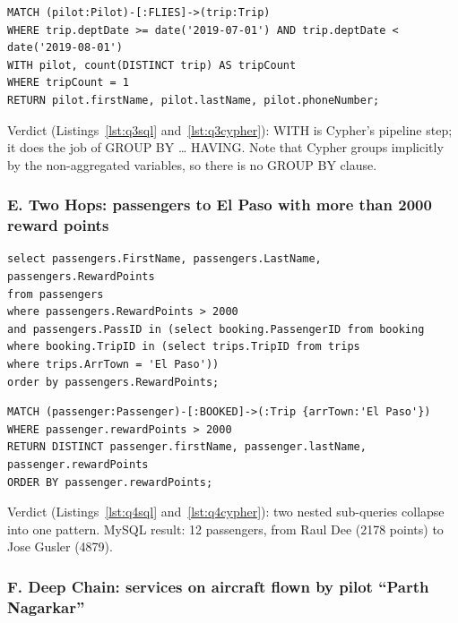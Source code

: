 \documentclass[10pt,a4paper,twocolumn]{article}
\begin{document}
\begin{lstlisting}[style=cyphercode,caption={The same query in Cypher, using WITH in place of GROUP BY and HAVING},label={lst:q3cypher}]
MATCH (pilot:Pilot)-[:FLIES]->(trip:Trip)
WHERE trip.deptDate >= date('2019-07-01') AND trip.deptDate < date('2019-08-01')
WITH pilot, count(DISTINCT trip) AS tripCount
WHERE tripCount = 1
RETURN pilot.firstName, pilot.lastName, pilot.phoneNumber;
\end{lstlisting}

Verdict (Listings~\ref{lst:q3sql} and~\ref{lst:q3cypher}): WITH is Cypher's pipeline step; it does the job of GROUP BY \ldots{} HAVING. Note that Cypher groups implicitly by the non-aggregated variables, so there is no GROUP BY clause.

\subsubsection*{E. Two Hops: passengers to El Paso with more than 2000 reward points}

\begin{lstlisting}[style=sqlcode,caption={Passengers to El Paso with more than 2000 reward points, in SQL},label={lst:q4sql}]
select passengers.FirstName, passengers.LastName, passengers.RewardPoints
from passengers
where passengers.RewardPoints > 2000
and passengers.PassID in (select booking.PassengerID from booking
where booking.TripID in (select trips.TripID from trips
where trips.ArrTown = 'El Paso'))
order by passengers.RewardPoints;
\end{lstlisting}

\begin{lstlisting}[style=cyphercode,caption={The same query in Cypher, two nested sub-queries collapsed into one pattern},label={lst:q4cypher}]
MATCH (passenger:Passenger)-[:BOOKED]->(:Trip {arrTown:'El Paso'})
WHERE passenger.rewardPoints > 2000
RETURN DISTINCT passenger.firstName, passenger.lastName, passenger.rewardPoints
ORDER BY passenger.rewardPoints;
\end{lstlisting}

Verdict (Listings~\ref{lst:q4sql} and~\ref{lst:q4cypher}): two nested sub-queries collapse into one pattern. MySQL result: 12 passengers, from Raul Dee (2178 points) to Jose Gusler (4879).

\subsubsection*{F. Deep Chain: services on aircraft flown by pilot ``Parth Nagarkar''}
\end{document}
